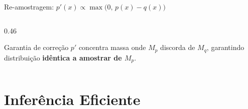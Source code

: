 \documentclass[aspectratio=169, xcolor=dvipsnames]{beamer}
\begin{document}
\begin{frame}{Re-amostragem: $p'(x) \propto \max\!\bigl(0,\, p(x) - q(x)\bigr)$}
\begin{columns}[T]
\begin{column}{0.46\textwidth}
{}
        \vspace{0.2em}
        \begin{block}{Garantia de correção}
          $p'$ concentra massa onde $M_p$ discorda de $M_q$, garantindo distribuição \textbf{idêntica a amostrar de $M_p$}.
        \end{block}
      \end{column}
    \end{columns}
  \end{frame}


  \section{Inferência Eficiente}
\end{document}
